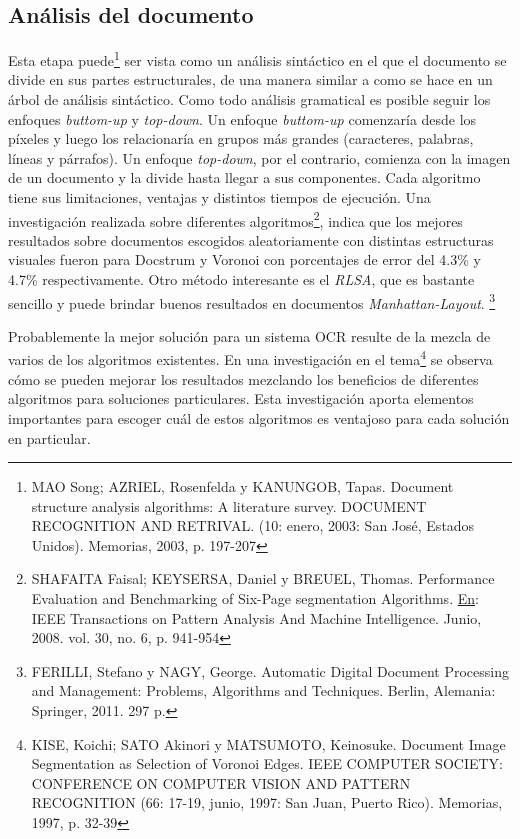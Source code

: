 \documentclass[a4paper, 11pt, oneside]{report}
\begin{document}
\subsection{Análisis del documento}

Esta etapa puede\footnote{MAO Song; AZRIEL, Rosenfelda y KANUNGOB, Tapas. Document structure analysis algorithms: A literature survey. DOCUMENT RECOGNITION AND RETRIVAL. (10: enero, 2003: San José, Estados Unidos).  Memorias, 2003, p. 197-207} ser vista como un análisis sintáctico en el que el documento se divide en sus partes estructurales, de una manera similar a como se hace en un árbol de análisis sintáctico. Como todo análisis gramatical es posible seguir los enfoques \textit{buttom-up} y \textit{top-down}. Un enfoque \textit{buttom-up} comenzaría desde los píxeles y luego los relacionaría en grupos más grandes (caracteres, palabras, líneas y párrafos). Un enfoque \textit{top-down}, por el contrario, comienza con la imagen de un documento y la divide hasta llegar a sus componentes. Cada algoritmo tiene sus limitaciones, ventajas y distintos tiempos de ejecución. Una investigación realizada sobre diferentes algoritmos\footnote{SHAFAITA Faisal; KEYSERSA,  Daniel y BREUEL, Thomas. Performance Evaluation and Benchmarking of Six-Page segmentation Algorithms. \underline{En}: IEEE Transactions on Pattern Analysis And Machine Intelligence.  Junio, 2008. vol. 30, no. 6, p. 941-954}, indica que los mejores resultados sobre documentos escogidos aleatoriamente con distintas estructuras visuales fueron para Docstrum y Voronoi con porcentajes de error del 4.3\% y 4.7\% respectivamente. Otro método interesante es el \textit{RLSA}, que es bastante sencillo y puede brindar buenos resultados en documentos \textit{Manhattan-Layout}. \footnote{FERILLI, Stefano y NAGY, George. Automatic Digital Document Processing and Management: Problems, Algorithms and Techniques. Berlin, Alemania: Springer, 2011. 297 p.} 

Probablemente la mejor solución para un sistema OCR resulte de la mezcla de varios de los algoritmos existentes. En una investigación en el tema\footnote{KISE, Koichi; SATO Akinori y MATSUMOTO,  Keinosuke. Document Image Segmentation as Selection of Voronoi Edges. IEEE COMPUTER SOCIETY: CONFERENCE ON COMPUTER VISION AND PATTERN RECOGNITION (66: 17-19, junio, 1997: San Juan,  Puerto Rico). Memorias, 1997, p. 32-39} se observa cómo se pueden mejorar los resultados mezclando los beneficios de diferentes algoritmos para soluciones particulares. Esta investigación aporta elementos importantes para escoger cuál de estos algoritmos es ventajoso para cada solución en particular.  
\end{document}
